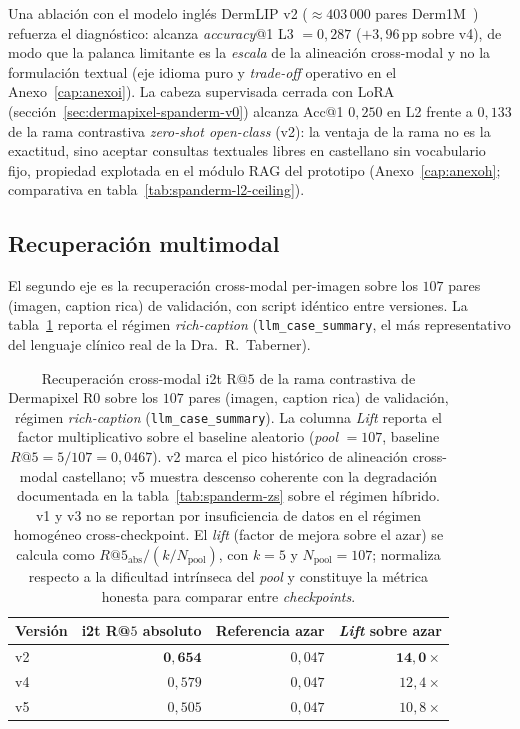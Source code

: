 Una ablación con el modelo inglés DermLIP v2 ($\approx 403\,000$ pares
Derm1M~\cite{derm1m}) refuerza el diagnóstico: alcanza
\emph{accuracy}@1 L3 $= 0{,}287$ ($+3{,}96$\,pp sobre v4), de modo que
la palanca limitante es la \emph{escala} de la alineación cross-modal y
no la formulación textual (eje idioma puro y \emph{trade-off} operativo
en el Anexo~\ref{cap:anexoi}). La cabeza supervisada cerrada con LoRA
(sección~\ref{sec:dermapixel-spanderm-v0}) alcanza Acc@1 $0{,}250$ en L2
frente a $0{,}133$ de la rama contrastiva \emph{zero-shot open-class}
(v2): la ventaja de la rama no es la exactitud, sino aceptar consultas
textuales libres en castellano sin vocabulario fijo, propiedad explotada
en el módulo RAG del prototipo (Anexo~\ref{cap:anexoh}; comparativa en
tabla~\ref{tab:spanderm-l2-ceiling}).

\subsection{Recuperación multimodal}

El segundo eje es la recuperación cross-modal per-imagen sobre los
$107$ pares (imagen, caption rica) de validación, con script idéntico
entre versiones. La tabla~\ref{tab:spanderm-retrieval} reporta el
régimen \emph{rich-caption} (\texttt{llm\_case\_summary}, el más
representativo del lenguaje clínico real de la Dra.~R.~Taberner).

\begin{table}[H]
\centering
\footnotesize
\setlength{\tabcolsep}{4pt}
\renewcommand{\arraystretch}{0.95}
\caption{Recuperación cross-modal i2t R@$5$ de la rama contrastiva
de Dermapixel R0 sobre
los $107$ pares (imagen, caption rica) de validación, régimen
\emph{rich-caption} (\texttt{llm\_case\_summary}). La columna
\emph{Lift} reporta el factor multiplicativo sobre el baseline
aleatorio (\emph{pool} $= 107$, baseline $R@5 = 5/107 = 0{,}0467$).
v2 marca el pico histórico de alineación cross-modal castellano;
v5 muestra descenso coherente con la degradación documentada en
la tabla~\ref{tab:spanderm-zs} sobre el régimen híbrido. v1 y v3
no se reportan por insuficiencia de datos en el régimen
homogéneo cross-checkpoint. El \emph{lift} (factor de mejora sobre
el azar) se calcula como
$R@5_{\mathrm{abs}} / (k / N_{\mathrm{pool}})$, con
$k = 5$ y $N_{\mathrm{pool}} = 107$; normaliza respecto a la
dificultad intrínseca del \emph{pool} y constituye la métrica
honesta para comparar entre \emph{checkpoints}.}
\label{tab:spanderm-retrieval}
\begin{tabular}{lrrr}
\hline
Versión & i2t R@$5$ absoluto  & Referencia azar & \emph{Lift} sobre azar   \\
\hline
v2      & $\mathbf{0{,}654}$  & $0{,}047$       & $\mathbf{14{,}0\times}$  \\
v4      & $0{,}579$           & $0{,}047$       & $12{,}4\times$           \\
v5      & $0{,}505$           & $0{,}047$       & $10{,}8\times$           \\
\hline
\end{tabular}
\end{table}

